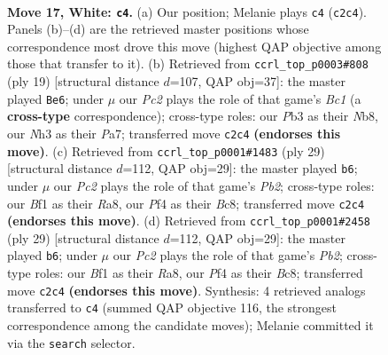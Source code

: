 \documentclass[11pt]{article}
\begin{document}
\clearpage

\begin{figure}[p]\centering
\begin{subfigure}{0.46\textwidth}\centering
\resizebox{\linewidth}{!}{%
\newchessgame
\chessboard[
  setfen={rn1k3r/3n4/bp2p1p1/pNqpPp2/5P1p/1P5N/P1PK2PP/R2Q1B1R w - - 2 17},
  showmover=false,
  pgfstyle=straightmove, color=movearrow, markmove={c2-c4}
]}
\caption{}
\end{subfigure}\hfill
\begin{subfigure}{0.46\textwidth}\centering
\resizebox{\linewidth}{!}{%
\newchessgame
\chessboard[
  setfen={rnb1k2r/pp2q1pp/2p5/3p1p2/3Pn3/2NBPN2/PP3PPP/R2QK2R b KQkq - 1 10},
  showmover=false,
  pgfstyle=straightmove, color=movearrow, markmove={c8-e6}
]}
\caption{}
\end{subfigure}
\\[4pt]
\begin{subfigure}{0.46\textwidth}\centering
\resizebox{\linewidth}{!}{%
\newchessgame
\chessboard[
  setfen={r1bq1rk1/pp2ppbp/6p1/nQp1P3/2P4P/2P2NP1/P4PB1/R1B1R1K1 b - - 2 15},
  showmover=false,
  pgfstyle=straightmove, color=movearrow, markmove={b7-b6}
]}
\caption{}
\end{subfigure}\hfill
\begin{subfigure}{0.46\textwidth}\centering
\resizebox{\linewidth}{!}{%
\newchessgame
\chessboard[
  setfen={r1bq1rk1/pp2ppbp/6p1/nQp1P3/2P4P/2P2NP1/P4PB1/R1B1R1K1 b - - 2 15},
  showmover=false,
  pgfstyle=straightmove, color=movearrow, markmove={b7-b6}
]}
\caption{}
\end{subfigure}
\caption{\textbf{Move 17, White: \texttt{c4}.} (a) Our position; Melanie plays \texttt{c4} (\texttt{c2c4}). Panels (b)--(d) are the retrieved master positions whose correspondence most drove this move (highest QAP objective among those that transfer to it). (b) Retrieved from \texttt{ccrl\_top\_p0003\#808} (ply 19) [structural distance $d$=107, QAP obj=37]: the master played \texttt{Be6}; under $\mu$ our \emph{Pc2} plays the role of that game's \emph{Bc1} (a \textbf{cross-type} correspondence); cross-type roles: our \emph{P}b3 as their \emph{N}b8, our \emph{N}h3 as their \emph{P}a7; transferred move \texttt{c2c4} \textbf{(endorses this move)}. (c) Retrieved from \texttt{ccrl\_top\_p0001\#1483} (ply 29) [structural distance $d$=112, QAP obj=29]: the master played \texttt{b6}; under $\mu$ our \emph{Pc2} plays the role of that game's \emph{Pb2}; cross-type roles: our \emph{B}f1 as their \emph{R}a8, our \emph{P}f4 as their \emph{B}c8; transferred move \texttt{c2c4} \textbf{(endorses this move)}. (d) Retrieved from \texttt{ccrl\_top\_p0001\#2458} (ply 29) [structural distance $d$=112, QAP obj=29]: the master played \texttt{b6}; under $\mu$ our \emph{Pc2} plays the role of that game's \emph{Pb2}; cross-type roles: our \emph{B}f1 as their \emph{R}a8, our \emph{P}f4 as their \emph{B}c8; transferred move \texttt{c2c4} \textbf{(endorses this move)}. Synthesis: 4 retrieved analogs transferred to \texttt{c4} (summed QAP objective 116, the strongest correspondence among the candidate moves); Melanie committed it via the \texttt{search} selector.}
\label{fig:thought-m32}
\end{figure}
\end{document}
